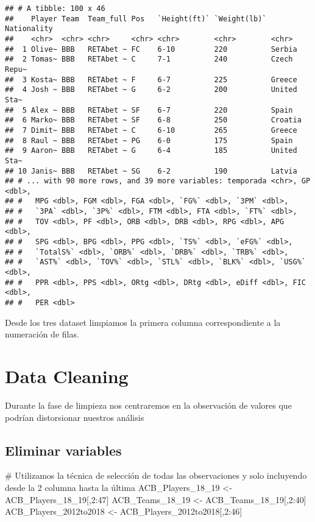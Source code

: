\documentclass[]{article}
\newenvironment{Shaded}{\begin{snugshade}}{\end{snugshade}}
\newcommand{\DecValTok}[1]{\textcolor[rgb]{0.86,0.86,0.80}{#1}}
\newcommand{\StringTok}[1]{\textcolor[rgb]{0.80,0.58,0.58}{#1}}
\newcommand{\CommentTok}[1]{\textcolor[rgb]{0.50,0.62,0.50}{#1}}
\newcommand{\OperatorTok}[1]{\textcolor[rgb]{0.94,0.94,0.82}{#1}}
\newcommand{\NormalTok}[1]{\textcolor[rgb]{0.80,0.80,0.80}{#1}}
\begin{document}
\begin{verbatim}
## # A tibble: 100 x 46
##    Player Team  Team_full Pos   `Height(ft)` `Weight(lb)` Nationality
##    <chr>  <chr> <chr>     <chr> <chr>        <chr>        <chr>      
##  1 Olive~ BBB   RETAbet ~ FC    6-10         220          Serbia     
##  2 Tomas~ BBB   RETAbet ~ C     7-1          240          Czech Repu~
##  3 Kosta~ BBB   RETAbet ~ F     6-7          225          Greece     
##  4 Josh ~ BBB   RETAbet ~ G     6-2          200          United Sta~
##  5 Alex ~ BBB   RETAbet ~ SF    6-7          220          Spain      
##  6 Marko~ BBB   RETAbet ~ SF    6-8          250          Croatia    
##  7 Dimit~ BBB   RETAbet ~ C     6-10         265          Greece     
##  8 Raul ~ BBB   RETAbet ~ PG    6-0          175          Spain      
##  9 Aaron~ BBB   RETAbet ~ G     6-4          185          United Sta~
## 10 Janis~ BBB   RETAbet ~ SG    6-2          190          Latvia     
## # ... with 90 more rows, and 39 more variables: temporada <chr>, GP <dbl>,
## #   MPG <dbl>, FGM <dbl>, FGA <dbl>, `FG%` <dbl>, `3PM` <dbl>,
## #   `3PA` <dbl>, `3P%` <dbl>, FTM <dbl>, FTA <dbl>, `FT%` <dbl>,
## #   TOV <dbl>, PF <dbl>, ORB <dbl>, DRB <dbl>, RPG <dbl>, APG <dbl>,
## #   SPG <dbl>, BPG <dbl>, PPG <dbl>, `TS%` <dbl>, `eFG%` <dbl>,
## #   `TotalS%` <dbl>, `ORB%` <dbl>, `DRB%` <dbl>, `TRB%` <dbl>,
## #   `AST%` <dbl>, `TOV%` <dbl>, `STL%` <dbl>, `BLK%` <dbl>, `USG%` <dbl>,
## #   PPR <dbl>, PPS <dbl>, ORtg <dbl>, DRtg <dbl>, eDiff <dbl>, FIC <dbl>,
## #   PER <dbl>
\end{verbatim}

Desde los tres dataset limpiamos la primera columna correspondiente a la
numeración de filas.

\section{Data Cleaning}\label{data-cleaning}

Durante la fase de limpieza nos centraremos en la observación de valores
que podrían distorsionar nuestros análisis

\subsection{Eliminar variables}\label{eliminar-variables}

\begin{Shaded}
\begin{Highlighting}[]
\CommentTok{# Utilizamos la técnica de selección de todas las observaciones y solo incluyendo desde la 2 columna hasta la última}
\NormalTok{ACB_Players_18_}\DecValTok{19}\NormalTok{ <-}\StringTok{ }\NormalTok{ACB_Players_18_}\DecValTok{19}\NormalTok{[,}\DecValTok{2}\OperatorTok{:}\DecValTok{47}\NormalTok{]}
\NormalTok{ACB_Teams_18_}\DecValTok{19}\NormalTok{ <-}\StringTok{ }\NormalTok{ACB_Teams_18_}\DecValTok{19}\NormalTok{[,}\DecValTok{2}\OperatorTok{:}\DecValTok{40}\NormalTok{]}
\NormalTok{ACB_Players_2012to2018 <-}\StringTok{ }\NormalTok{ACB_Players_2012to2018[,}\DecValTok{2}\OperatorTok{:}\DecValTok{46}\NormalTok{]}
\end{Highlighting}
\end{Shaded}
\end{document}
